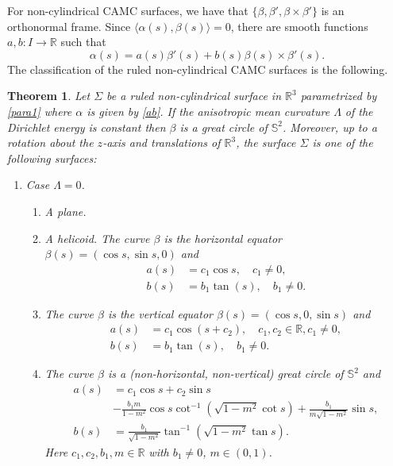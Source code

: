 \documentclass[12pt,a4paper,reqno]{amsart}
\def\r{\mathbb R}
\def\s{\mathbb S}
\newtheorem{theorem}{Theorem}[section]
\begin{document}
 For non-cylindrical CAMC surfaces, we have that  $\{\beta,\beta',\beta\times\beta'\}$ is an orthonormal frame. Since  $\langle \alpha(s),\beta(s)\rangle=0$, there are smooth functions $a,b\colon I\to\r$ such that 
\begin{equation}\label{ab}
\alpha(s)=a(s)\beta'(s)+ b(s)\beta(s)\times\beta'(s).
\end{equation}
The classification of the ruled non-cylindrical CAMC surfaces is  the following. 

\begin{theorem}\label{t1} Let $\Sigma$ be a ruled non-cylindrical surface in $\r^3$ parametrized by \eqref{para1} where $\alpha$ is given by \eqref{ab}. If the anisotropic mean curvature $\Lambda$  of the Dirichlet energy is constant then $\beta$ is a great circle of $\s^2$. Moreover, up to a rotation about the $z$-axis and translations of $\r^3$, the surface $\Sigma$ is one of the following surfaces:
\begin{enumerate}
\item Case $\Lambda=0$.
\begin{enumerate}
\item A plane.
\item A helicoid. The curve  $\beta$ is the horizontal equator $\beta(s)=(\cos s,\sin s,0)$ and
 \begin{equation}\label{sol1}
\begin{split}
a(s)&=c_1\cos s,\quad  c_1\not=0,\\
b(s)&=b_1\tan(s),\quad b_1\not=0.
\end{split}
\end{equation}

\item The curve $\beta$ is the vertical equator $\beta(s)=(\cos s,0,\sin s)$ and 
\begin{equation}\label{sol2}
\begin{split}
a(s)&=c_1\cos(s+c_2),\quad c_1,c_2\in\r, c_1\not=0,\\
b(s)&=b_1\tan(s),\quad b_1\not=0.
\end{split}
\end{equation}
\item The curve $\beta$ is a (non-horizontal, non-vertical) great circle of $\s^2$ and 
\begin{equation}\label{sol3}
\begin{split}
a(s)&=c_1\cos s+c_2\sin s\\
&- \frac{b_1 m}{1-m^2}\cos s \cot^{-1}(\sqrt{1-m^2}\cot s)+\frac{b_1}{m\sqrt{1-m^2}}\sin s,\\
b(s)&=\frac{b_1}{\sqrt{1-m^2}}\tan^{-1}(\sqrt{1-m^2}\tan s).
\end{split}
\end{equation}
 Here $ c_1,c_2,b_1,m \in\r$ with $b_1\not=0$, $m\in (0,1)$.  



\end{enumerate}
\end{enumerate}
\end{theorem}
\end{document}
